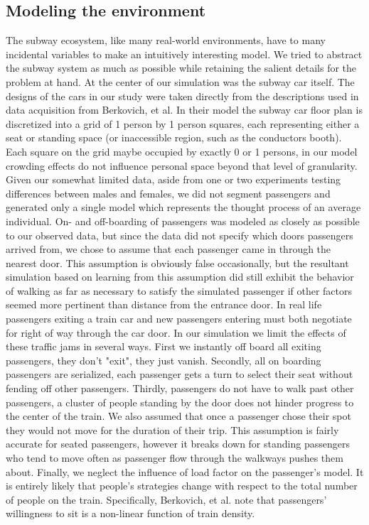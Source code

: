 \documentclass{acm_proc_article-sp}
\begin{document}
\subsection{Modeling the environment}
The subway ecosystem, like many real-world environments, have to many incidental variables to make an intuitively interesting model. We tried to abstract the subway system as much as possible while retaining the salient details for the problem at hand. At the center of our simulation was the subway car itself. The designs of the cars in our study were taken directly from the descriptions used in data acquisition from Berkovich, et al. In their model the subway car floor plan is discretized into a grid of 1 person by 1 person squares, each representing either a seat or standing space (or inaccessible region, such as the conductors booth). Each square on the grid maybe occupied by exactly 0 or 1 persons, in our model crowding effects do not influence personal space beyond that level of granularity. Given our somewhat limited data, aside from one or two experiments testing differences between males and females, we did not segment passengers and generated only a single model which represents the thought process of an average individual. On- and off-boarding of passengers was modeled as closely as possible to our observed data, but since the data did not specify which doors passengers arrived from, we chose to assume that each passenger came in through the nearest door. This assumption is obviously false occasionally, but the resultant simulation based on learning from this assumption did still exhibit the behavior of walking as far as necessary to satisfy the simulated passenger if other factors seemed more pertinent than distance from the entrance door. In real life passengers exiting a train car and new passengers entering must both negotiate for right of way through the car door. In our simulation we limit the effects of these traffic jams in several ways. First we instantly off board all exiting passengers, they don't "exit", they just vanish. Secondly, all on boarding passengers are serialized, each passenger gets a turn to select their seat without fending off other passengers. Thirdly, passengers do not have to walk past other passengers, a cluster of people standing by the door does not hinder progress to the center of the train. We also assumed that once a passenger chose their spot they would not move for the duration of their trip. This assumption is fairly accurate for seated passengers, however it breaks down for standing passengers who tend to move often as passenger flow through the walkways pushes them about. Finally, we neglect the influence of load factor on the passenger's model. It is entirely likely that people's strategies change with respect to the total number of people on the train. Specifically, Berkovich, et al. note that passengers' willingness to sit is a non-linear function of train density.
\end{document}
